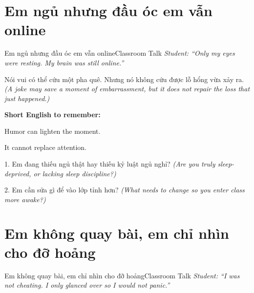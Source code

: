 \section{Em ngủ nhưng đầu óc em vẫn online}
\begin{truyen}{Em ngủ nhưng đầu óc em vẫn online}{Classroom Talk}
\textit{Student: ``Only my eyes were resting. My brain was still online.''}\\[4pt]



\end{truyen}

\begin{baihoc}
Nói vui có thể cứu một pha quê. Nhưng nó không cứu được lỗ hổng vừa xảy ra.
\textit{(A joke may save a moment of embarrassment, but it does not repair the loss that just happened.)}
\end{baihoc}

\begin{ghinhoanh}
\textbf{Short English to remember:}

Humor can lighten the moment.

It cannot replace attention.
\end{ghinhoanh}

\begin{tuhocnhanh}
1. Em đang thiếu ngủ thật hay thiếu kỷ luật ngủ nghỉ? \textit{(Are you truly sleep-deprived, or lacking sleep discipline?)}

2. Em cần sửa gì để vào lớp tỉnh hơn? \textit{(What needs to change so you enter class more awake?)}
\end{tuhocnhanh}
\ngancach

\section{Em không quay bài, em chỉ nhìn cho đỡ hoảng}
\begin{truyen}{Em không quay bài, em chỉ nhìn cho đỡ hoảng}{Classroom Talk}
\textit{Student: ``I was not cheating. I only glanced over so I would not panic.''}\\[4pt]



\end{truyen}

